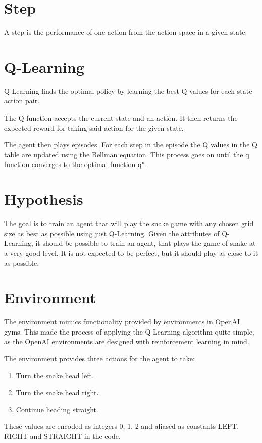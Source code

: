 \documentclass[lettersize,journal]{IEEEtran}
\begin{document}
\section{Step}
A step is the performance of one action from the action space in a given state.



\section{Q-Learning}
Q-Learning finds the optimal policy by learning
the best Q values for each state-action pair.

The Q function accepts the current state and an action. It then
returns the expected reward for taking said action for the given
state.

The agent then plays episodes. For each step in the episode
the Q values in the Q table are updated using the Bellman
equation. This process goes on until the q function converges
to the optimal function q*.

\section{Hypothesis}
The goal is to train an agent that will play the snake game
with any chosen grid size as best as possible using just Q-Learning.
Given the attributes of Q-Learning, it should be possible to train
an agent, that plays the game of snake at a very good level. It
is not expected to be perfect, but it should play as close to it
as possible.


\section{Environment}
The environment mimics functionality provided by environments in
OpenAI gyms. This made the process of applying the Q-Learning
algorithm quite simple, as the OpenAI environments are designed
with reinforcement learning in mind.

The environment provides three actions for the agent to take:
\begin{enumerate}
    \item Turn the snake head left.
    \item Turn the snake head right.
    \item Continue heading straight.
\end{enumerate}
These values are encoded as integers 0, 1, 2 and aliased as
constants LEFT, RIGHT and STRAIGHT in the code.
\end{document}
